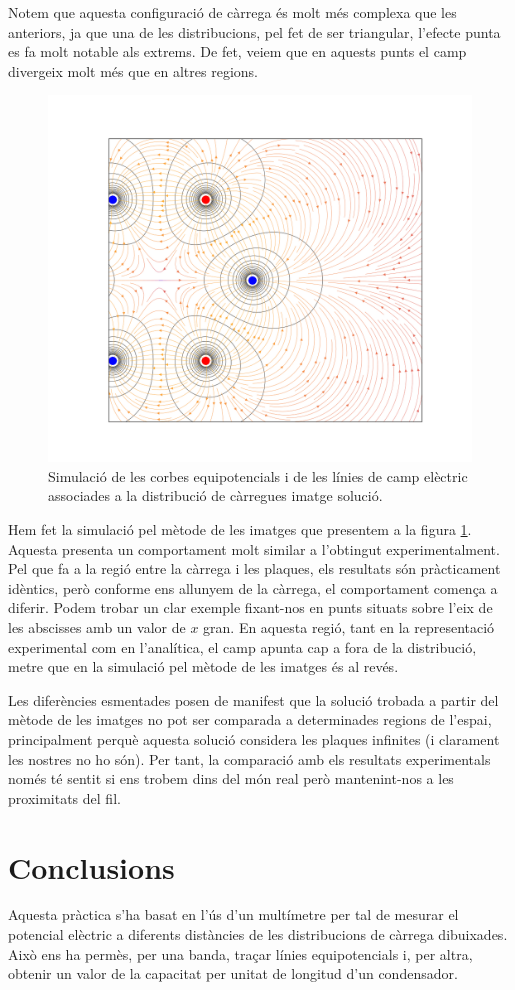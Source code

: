 \documentclass[a4paper,10.5pt]{report}
\begin{document}
Notem que aquesta configuració de càrrega és molt més complexa que les anteriors, ja que una de les distribucions, pel fet de ser triangular, l'efecte punta es fa molt notable als extrems. De fet, veiem que en aquests punts el camp divergeix molt més que en altres regions.

\begin{figure}[h]
	\centering
	\includegraphics[width=0.45\linewidth]{figV2imagenes}
	\caption{Simulació de les corbes equipotencials i de les línies de camp elèctric associades a la distribució de càrregues imatge solució.}
	\label{fig:1.5}
\end{figure}

Hem fet la simulació pel mètode de les imatges que presentem a la figura \ref{fig:1.5}. Aquesta presenta un comportament molt similar a l'obtingut experimentalment. Pel que fa a la regió entre la càrrega i les plaques, els resultats són pràcticament idèntics, però conforme ens allunyem de la càrrega, el comportament comença a diferir. Podem trobar un clar exemple fixant-nos en punts situats sobre l'eix de les abscisses amb un valor de $x$ gran. En aquesta regió, tant en la representació experimental com en l'analítica, el camp apunta cap a fora de la distribució, metre que en la simulació pel mètode de les imatges és al revés.

Les diferències esmentades posen de manifest que la solució trobada a partir del mètode de les imatges no pot ser comparada a determinades regions de l'espai, principalment perquè aquesta solució considera les plaques infinites (i clarament les nostres no ho són). Per tant, la comparació amb els  resultats experimentals només té sentit si ens trobem dins del món real però mantenint-nos a les proximitats del fil.


\section{Conclusions}
Aquesta pràctica s'ha basat en l'ús d'un multímetre per tal de mesurar el potencial elèctric a diferents distàncies de les distribucions de càrrega dibuixades. Això ens ha permès, per una banda, traçar línies equipotencials i, per altra, obtenir un valor de la capacitat per unitat de longitud d'un condensador.
\end{document}
